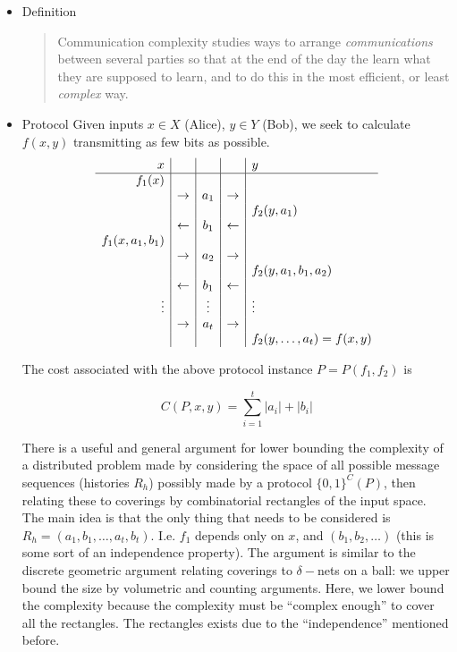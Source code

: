 \documentclass{article}
\begin{document}
\begin{itemize}

\item Definition
    \begin{quote}
        Communication complexity studies ways to arrange {\it communications} between several parties so that at the end of the day the learn what they are supposed to learn, and to do this in the most efficient, or least {\it complex} way.
    \end{quote}


\item Protocol
    Given inputs $x \in X$ (Alice), $y \in Y$ (Bob), we seek to calculate $f(x,y)$ transmitting as few bits as possible.
    \[
    \begin{array}{r | c | c | c | l}
        x & & & & y \\
        \hline
        f_1(x) &     &     &     &            \\
               & \rightarrow & a_1 & \rightarrow &            \\
               &     &     &     & f_2(y,a_1) \\
               & \leftarrow & b_1 & \leftarrow &            \\
        f_1(x,a_1,b_1) &     &     &     &    \\
               & \rightarrow & a_2 & \rightarrow &            \\
               &     &     &     & f_2(y,a_1,b_1,a_2) \\
               & \leftarrow & b_1 & \leftarrow &            \\
        \vdots &     & \vdots    &  & \vdots  \\
               & \rightarrow & a_t & \rightarrow &            \\
               &     &     &     & f_2(y,\dots,a_t) = f(x,y) \\
    \end{array}
    \]

    The cost associated with the above protocol instance $P = P(f_1,f_2)$ is

    \[ C(P,x,y) = \sum_{i=1}^t |a_i| + |b_i| \]

    There is a useful and general argument for lower bounding the complexity of a distributed problem made by considering the space of all possible message sequences (histories $R_h$) possibly made by a protocol $\{0,1\}^C(P)$, then relating these to coverings by combinatorial rectangles of the input space.  The main idea is that the only thing that needs to be considered is $R_h = (a_1,b_1,\dots,a_t,b_t)$.  I.e. $f_1$ depends only on $x$, and $(b_1,b_2,\dots)$ (this is some sort of an independence property).  The argument is similar to the discrete geometric argument relating coverings to $\delta-$nets on a ball: we upper bound the size by volumetric and counting arguments.  Here, we lower bound the complexity because the complexity must be ``complex enough'' to cover all the rectangles.  The rectangles exists due to the ``independence'' mentioned before.

\end{itemize}
\end{document}
